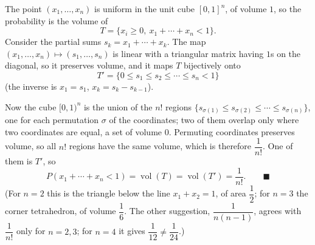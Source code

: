 The point $(x_1,\dots,x_n)$ is uniform in the unit cube $[0,1]^n$, of volume $1$, so the probability is the volume of
\[
T=\{x_i\ge0,\ x_1+\cdots+x_n<1\}.
\]
Consider the partial sums $s_k=x_1+\cdots+x_k$. The map $(x_1,\dots,x_n)\mapsto(s_1,\dots,s_n)$ is linear with a triangular matrix having $1$s on the diagonal, so it preserves volume, and it maps $T$ bijectively onto
\[
T'=\{0\le s_1\le s_2\le\cdots\le s_n<1\}
\]
(the inverse is $x_1=s_1$, $x_k=s_k-s_{k-1}$).

Now the cube $[0,1)^n$ is the union of the $n!$ regions $\{s_{\sigma(1)}\le s_{\sigma(2)}\le\cdots\le s_{\sigma(n)}\}$, one for each permutation $\sigma$ of the coordinates; two of them overlap only where two coordinates are equal, a set of volume $0$. Permuting coordinates preserves volume, so all $n!$ regions have the same volume, which is therefore $\dfrac{1}{n!}$. One of them is $T'$, so
\[
P(x_1+\cdots+x_n<1)=\operatorname{vol}(T)=\operatorname{vol}(T')=\boxed{\dfrac{1}{n!}} .\qquad\blacksquare
\]
(For $n=2$ this is the triangle below the line $x_1+x_2=1$, of area $\dfrac{1}{2}$; for $n=3$ the corner tetrahedron, of volume $\dfrac{1}{6}$. The other suggestion, $\dfrac{1}{n(n-1)}$, agrees with $\dfrac{1}{n!}$ only for $n=2,3$; for $n=4$ it gives $\dfrac{1}{12}\ne\dfrac{1}{24}$.)

